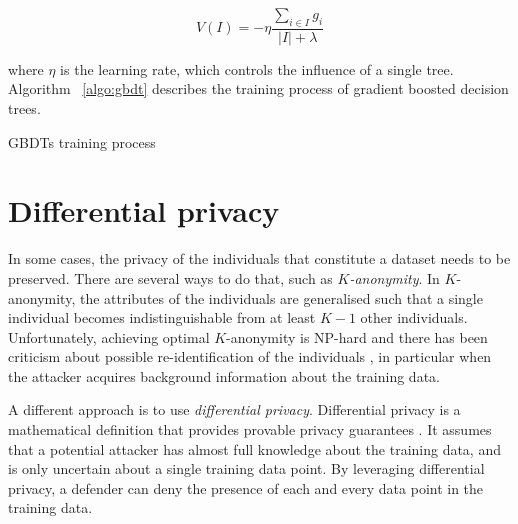 \begin{equation}\label{eq:gbdt_leaf_value}
	V(I) = - \eta \frac{\sum_{i \in I}g_i}{|I| + \lambda}	
\end{equation}
 
 where $\eta$ is the learning rate, which controls the influence of a single tree. Algorithm ~\ref{algo:gbdt} describes the training process of gradient boosted decision trees.

\begin{algorithm}
	\DontPrintSemicolon
	\caption{GBDTs training process}\label{algo:gbdt}
\end{algorithm}


\section{Differential privacy}\label{sec:dp}

In some cases, the privacy of the individuals that constitute a dataset needs to be preserved. There are several ways to do that, such as $K$\textit{-anonymity}. In $K$-anonymity, the attributes of the individuals are generalised such that a single individual becomes indistinguishable from at least $K-1$ other individuals. Unfortunately, achieving optimal $K$-anonymity is NP-hard and there has been criticism about possible re-identification of the individuals \cite{k-anon}, in particular when the attacker acquires background information about the training data. 

A different approach is to use \textit{differential privacy}. Differential privacy is a mathematical definition that provides provable privacy guarantees \cite{dwork}. It assumes that a potential attacker has almost full knowledge about the training data, and is only uncertain about a single training data point. By leveraging differential privacy, a defender can deny the presence of each and every data point in the training data.

